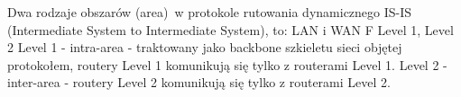 \answer
{Dwa rodzaje obszarów (area)~w protokole rutowania dynamicznego IS-IS (Intermediate System to Intermediate System), to:}
{LAN i WAN}
{F}
{Level 1, Level 2}
{Level 1 - intra-area - traktowany jako backbone szkieletu sieci objętej protokołem, routery Level 1 komunikują się tylko z routerami Level 1.
Level 2 - inter-area - routery Level 2 komunikują się tylko z routerami Level 2.}
